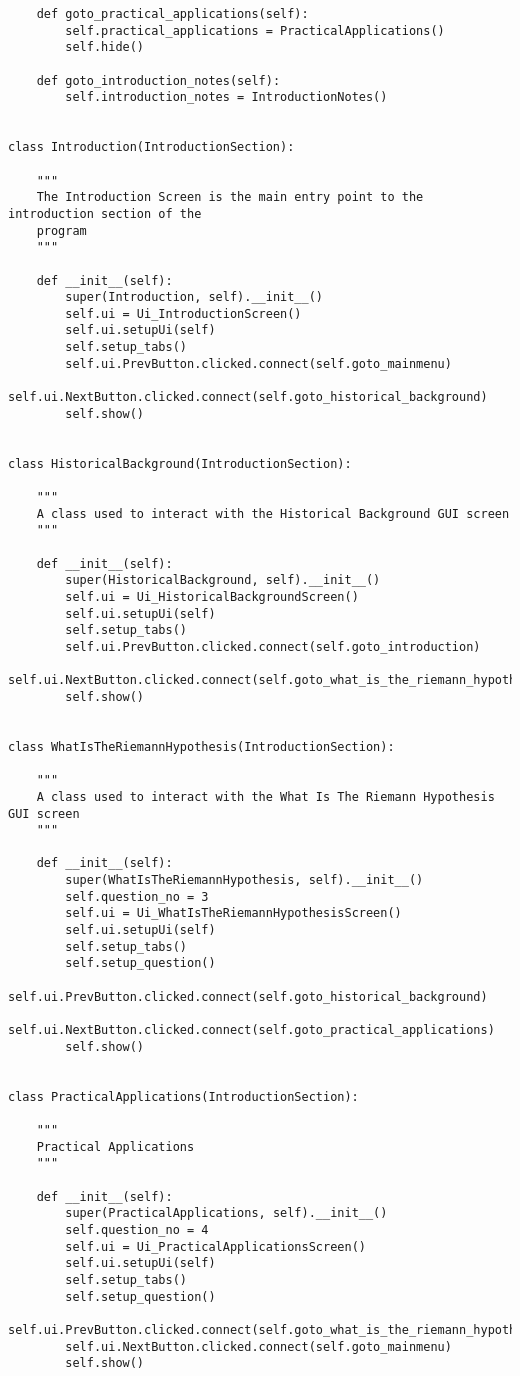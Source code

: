 \documentclass{article}
\begin{document}
\begin{lstlisting}
    def goto_practical_applications(self):
        self.practical_applications = PracticalApplications()
        self.hide()

    def goto_introduction_notes(self):
        self.introduction_notes = IntroductionNotes()


class Introduction(IntroductionSection):

    """
    The Introduction Screen is the main entry point to the introduction section of the
    program
    """

    def __init__(self):
        super(Introduction, self).__init__()
        self.ui = Ui_IntroductionScreen()
        self.ui.setupUi(self)
        self.setup_tabs()
        self.ui.PrevButton.clicked.connect(self.goto_mainmenu)
        self.ui.NextButton.clicked.connect(self.goto_historical_background)
        self.show()


class HistoricalBackground(IntroductionSection):

    """
    A class used to interact with the Historical Background GUI screen
    """

    def __init__(self):
        super(HistoricalBackground, self).__init__()
        self.ui = Ui_HistoricalBackgroundScreen()
        self.ui.setupUi(self)
        self.setup_tabs()
        self.ui.PrevButton.clicked.connect(self.goto_introduction)
        self.ui.NextButton.clicked.connect(self.goto_what_is_the_riemann_hypothesis)
        self.show()


class WhatIsTheRiemannHypothesis(IntroductionSection):

    """
    A class used to interact with the What Is The Riemann Hypothesis GUI screen
    """

    def __init__(self):
        super(WhatIsTheRiemannHypothesis, self).__init__()
        self.question_no = 3
        self.ui = Ui_WhatIsTheRiemannHypothesisScreen()
        self.ui.setupUi(self)
        self.setup_tabs()
        self.setup_question()
        self.ui.PrevButton.clicked.connect(self.goto_historical_background)
        self.ui.NextButton.clicked.connect(self.goto_practical_applications)
        self.show()


class PracticalApplications(IntroductionSection):

    """
    Practical Applications
    """

    def __init__(self):
        super(PracticalApplications, self).__init__()
        self.question_no = 4
        self.ui = Ui_PracticalApplicationsScreen()
        self.ui.setupUi(self)
        self.setup_tabs()
        self.setup_question()
        self.ui.PrevButton.clicked.connect(self.goto_what_is_the_riemann_hypothesis)
        self.ui.NextButton.clicked.connect(self.goto_mainmenu)
        self.show()
\end{lstlisting}
\end{document}
